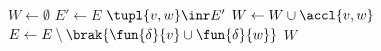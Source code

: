 \State $W\gets\emptyset$
\State $E'\gets E$
\State $\tupl{v,w}\inr E'$
\State $W\gets W\cup\accl{v,w}$
\State $E\gets E\setminus\brak{\fun{\delta}{v}\cup\fun{\delta}{w}}$
\EndWhile
\State \Return $W$
\EndFunction